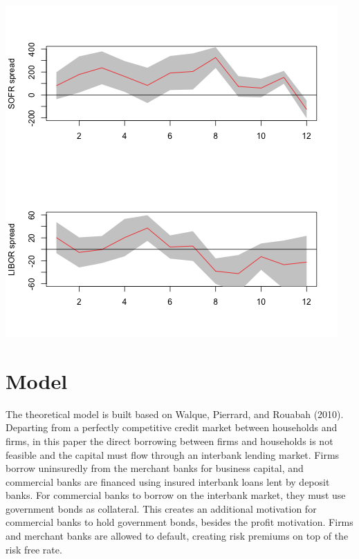 \documentclass[12pt]{article}
\begin{document}
\begin{center}
  \includegraphics[scale=0.8]{../lp/results/irfs.png}
\end{center}

\newpage
\section{Model}
The theoretical model is built based on Walque, Pierrard, and Rouabah (2010). Departing from a perfectly competitive credit market between households and firms, in this paper the direct borrowing between firms and households is not feasible and the capital must flow through an interbank lending market.
Firms borrow uninsuredly from the merchant banks for business capital, and commercial banks are financed using insured interbank loans lent by deposit banks. For commercial banks to borrow on the interbank market, they must use government bonds as collateral. This creates an additional motivation
for commercial banks to hold government bonds, besides the profit motivation. Firms and merchant banks are allowed to default, creating risk premiums on top of the risk free rate. 
\end{document}
